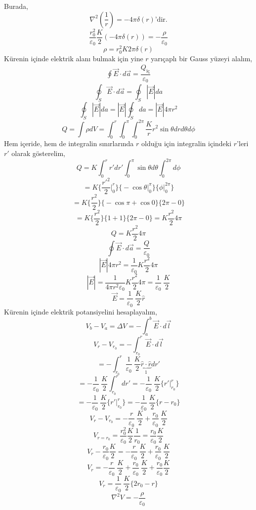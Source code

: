 Burada,
\[ \nabla^{2} (\dfrac{1}{r}) = - 4 \pi \delta (r) \textrm{'dir.} \]
\[  \dfrac{r_{0}^{2}}{\varepsilon_{0}} \dfrac{K}{2} ( - 4 \pi \delta (r) ) = - \dfrac{\rho}{\varepsilon_{0}} \]
\[ \rho = r_{0}^{2} K 2 \pi \delta (r) \]
Kürenin içinde elektrik alanı bulmak için yine $r$ yarıçaplı bir Gauss yüzeyi alalım,
\begin{align*}
 \oint \Vec{E} \cdot d\Vec{a} = \dfrac{Q_{\text{iç}}}{ \varepsilon_{0}}
\end{align*}
\[  \oint_{S} \Vec{E} \cdot d\Vec{a} = \oint_{S} |\Vec{E}| da \]
\[\oint_{S}  |\Vec{E}| da =  |\Vec{E}| \oint_{S} da =  |\Vec{E}| 4 \pi r^{2} \]
\[ Q = \int \rho dV  = \int_{0}^{r} \int_{0}^{\pi}  \int_{0}^{2 \pi} \dfrac{K}{r} r^{2} \sin \theta dr d\theta d \phi \]
Hem içeride, hem de integralin sınırlarında $r$ olduğu için integralin içindeki $r$'leri $r'$ olarak gösterelim,
\[ Q =  K \int_{0}^{r}  r' dr' \int_{0}^{\pi} \sin \theta d\theta  \int_{0}^{2 \pi} d \phi \]
\[ =  K  \Bigg\{ \dfrac{r'^{2}}{2} \Bigg|_{0}^{r} \Bigg\} \Bigg\{ - \cos \theta \Bigg|_{0}^{\pi} \Bigg\}  \Bigg\{ \phi \Bigg|_{0}^{2 \pi} \Bigg\} \]
\[ =  K  \Bigg\{ \dfrac{r^{2}}{2} \Bigg\} \Bigg\{ - \cos \pi + \cos 0 \Bigg\}  \Bigg\{ 2 \pi - 0 \Bigg\} \]
\[ =  K  \Bigg\{ \dfrac{r^{2}}{2} \Bigg\} \Bigg\{ 1 + 1 \Bigg\}  \Bigg\{ 2 \pi - 0 \Bigg\}  = K  \dfrac{r^{2}}{2} 4 \pi \]
\[ Q =  K  \dfrac{r^{2}}{2} 4 \pi\]
\[ \oint \Vec{E} \cdot d\Vec{a} = \dfrac{Q}{\varepsilon_{0}}  \]
\[ |\Vec{E}| 4 \pi r^{2} = \dfrac{1}{\varepsilon_{0}}  K  \dfrac{r^{2}}{2} 4 \pi \]
\[ |\Vec{E}|  = \dfrac{1}{ 4 \pi r^{2} \varepsilon_{0}}   K  \dfrac{r^{2}}{2}  4 \pi = \dfrac{1}{\varepsilon_{0}}\ \dfrac{K}{2}\]
\[ \Vec{E} = \dfrac{1}{\varepsilon_{0}}\ \dfrac{K}{2} \hat{r} \]
Kürenin içinde elektrik potansiyelini hesaplayalım,
\[ V_{b} - V_{a} = \Delta V = - \int_{a}^{b} \Vec{E} \cdot d \Vec{l} \]
\[ V_{r} - V_{r_{0}}  = - \int_{r_{0}}^{r} \Vec{E} \cdot d \Vec{l} \]
\[  = - \int_{r_{0}}^{r} \dfrac{1}{\varepsilon_{0}}\ \dfrac{K}{2} \underbrace{ \hat{r} \cdot \hat{r}}_{1} dr' \]
\[  = - \dfrac{1}{\varepsilon_{0}}\ \dfrac{K}{2} \int_{r_{0}}^{r} dr' = - \dfrac{1}{\varepsilon_{0}}\ \dfrac{K}{2} \Bigg\{ r' \Bigg|_{r_{0}}^{r} \Bigg\} \]
\[ =  - \dfrac{1}{\varepsilon_{0}}\ \dfrac{K}{2} \Bigg\{ r' \Bigg|_{r_{0}}^{r} \Bigg\} =  - \dfrac{1}{\varepsilon_{0}}\ \dfrac{K}{2} \Bigg\{ r  - r_{0} \Bigg\} \]
\[ V_{r} - V_{r_{0}} =  - \dfrac{r}{\varepsilon_{0}}\ \dfrac{K}{2} + \dfrac{r_{0}}{\varepsilon_{0}}\ \dfrac{K}{2} \]
\[ V_{r=r_{0}} =  \dfrac{r_{0}^{2}}{\varepsilon_{0}} \dfrac{K}{2} \dfrac{1}{r_{0}} = \dfrac{r_{0}}{\varepsilon_{0}} \dfrac{K}{2} \]
\[ V_{r} - \dfrac{r_{0}}{\varepsilon_{0}} \dfrac{K}{2}  =  - \dfrac{r}{\varepsilon_{0}}\ \dfrac{K}{2} + \dfrac{r_{0}}{\varepsilon_{0}}\ \dfrac{K}{2} \]
\[ V_{r}  =  - \dfrac{r}{\varepsilon_{0}}\ \dfrac{K}{2} + \dfrac{r_{0}}{\varepsilon_{0}}\ \dfrac{K}{2}  + \dfrac{r_{0}}{\varepsilon_{0}} \dfrac{K}{2}\]
\[ V_{r}  = \dfrac{1}{\varepsilon_{0}}\ \dfrac{K}{2} \Bigg\{ 2 r_{0} - r \Bigg\} \]
\[ \nabla^{2}V = - \dfrac{\rho}{\varepsilon_{0}} \]
\newpage



